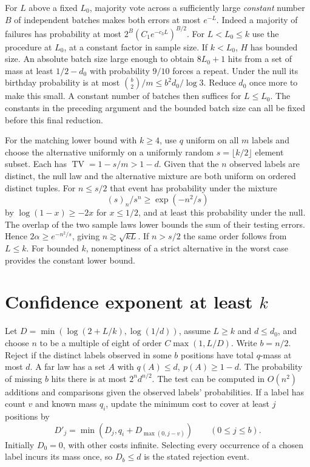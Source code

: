 \documentclass[11pt]{article}
\newcommand{\TV}{\operatorname{TV}}
\begin{document}
For \(L\) above a fixed \(L_0\), majority vote across a sufficiently large \emph{constant} number \(B\) of independent batches makes both errors at most \(e^{-L}\). Indeed a majority of failures has probability at most \(2^B(C_1 e^{-c_3 L})^{B/2}\). For \(L<L_0\le k\) use the procedure at \(L_0\), at a constant factor in sample size. If \(k<L_0\), \(H\) has bounded size. An absolute batch size large enough to obtain \(8L_0+1\) hits from a set of mass at least \(1/2-d_0\) with probability \(9/10\) forces a repeat. Under the null its birthday probability is at most \(\binom b2/m\le b^2d_0/\log3\). Reduce \(d_0\) once more to make this small. A constant number of batches then suffices for \(L\le L_0\). The constants in the preceding argument and the bounded batch size can all be fixed before this final reduction.

For the matching lower bound with \(k\ge4\), use \(q\) uniform on all \(m\) labels and choose the alternative uniformly on a uniformly random \(s=\lfloor k/2\rfloor\) element subset. Each has \(\TV=1-s/m>1-d\). Given that the \(n\) observed labels are distinct, the null law and the alternative mixture are both uniform on ordered distinct tuples. For \(n\le s/2\) that event has probability under the mixture
\[
(s)_n/s^n\ge\exp(-n^2/s)
\]
by \(\log(1-x)\ge-2x\) for \(x\le1/2\), and at least this probability under the null. The overlap of the two sample laws lower bounds the sum of their testing errors. Hence \(2\alpha\ge e^{-n^2/s}\), giving \(n\gtrsim\sqrt{kL}\). If \(n>s/2\) the same order follows from \(L\le k\). For bounded \(k\), nonemptiness of a strict alternative in the worst case provides the constant lower bound.

\section{Confidence exponent at least \(k\)}
Let \(D=\min(\log(2+L/k),\log(1/d))\), assume \(L\ge k\) and \(d\le d_0\), and choose \(n\) to be a multiple of eight of order \(C\max(1,L/D)\). Write \(b=n/2\). Reject if the distinct labels observed in some \(b\) positions have total \(q\)-mass at most \(d\). A far law has a set \(A\) with \(q(A)\le d,\ p(A)\ge1-d\). The probability of missing \(b\) hits there is at most \(2^n d^{n/2}\). The test can be computed in \(O(n^2)\) additions and comparisons given the observed labels' probabilities. If a label has count \(v\) and known mass \(q_i\), update the minimum cost to cover at least \(j\) positions by
\[
D'_j=\min(D_j,q_i+D_{\max(0,j-v)})
\qquad(0\le j\le b).
\]
Initially \(D_0=0\), with other costs infinite. Selecting every occurrence of a chosen label incurs its mass once, so \(D_b\le d\) is the stated rejection event.
\end{document}
